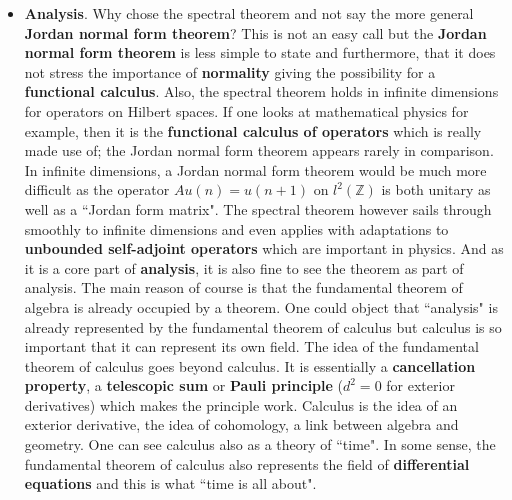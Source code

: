 \documentclass[12pt]{amsart}
\newcounter{example}    \def\example#1{ \item \fontsize{12}{15} \selectfont #1 \fontsize{12}{15} \selectfont }
\begin{document}
\begin{itemize}
\item {\bf Analysis}. Why chose the spectral theorem and not say the more general {\bf Jordan normal form theorem}? 
This is not an easy call but the {\bf Jordan normal form theorem} is less simple to state and 
furthermore, that it does not stress the importance of {\bf normality} giving the possibility 
for a {\bf functional calculus}. Also, the spectral theorem holds in infinite dimensions
for operators on Hilbert spaces. If one looks at mathematical physics for example,
then it is the {\bf functional calculus of operators} which is really made use of; 
the Jordan normal form theorem appears rarely in comparison. 
In infinite dimensions, a Jordan normal form theorem would be much more difficult
as the operator $Au(n) = u(n+1)$ on $l^2(\mathbb{Z})$ is both unitary as well as a ``Jordan form matrix". 
The spectral theorem however sails through smoothly to infinite dimensions and even applies with adaptations
to {\bf unbounded self-adjoint operators} which are important in physics. And as it is a core part of 
{\bf analysis}, it is also fine to see the theorem as part of analysis. The main reason of course is 
that the fundamental theorem of algebra is already occupied by a theorem. One could object that ``analysis" is 
already represented by the fundamental theorem of calculus but calculus is so important that it can represent
its own field. The idea of the fundamental theorem of calculus goes beyond calculus. It is essentially
a {\bf cancellation property}, a {\bf telescopic sum} or {\bf Pauli principle} ($d^2=0$ for exterior derivatives)
which makes the principle work. Calculus is the idea of an exterior derivative, the idea of cohomology, 
a link between algebra and geometry. One can see calculus also as a theory of ``time". In some sense, the fundamental 
theorem of calculus also represents the field of {\bf differential equations} and this is what 
``time is all about". 


\end{itemize}
\end{document}

